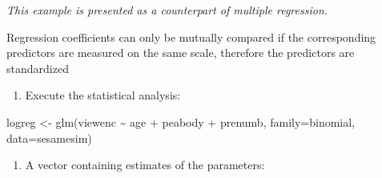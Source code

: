 \documentclass[
]{book}
\newenvironment{Shaded}{\begin{snugshade}}{\end{snugshade}}
\newcommand{\AttributeTok}[1]{\textcolor[rgb]{0.77,0.63,0.00}{#1}}
\newcommand{\FunctionTok}[1]{\textcolor[rgb]{0.00,0.00,0.00}{#1}}
\newcommand{\NormalTok}[1]{#1}
\newcommand{\OtherTok}[1]{\textcolor[rgb]{0.56,0.35,0.01}{#1}}
\newcommand{\SpecialCharTok}[1]{\textcolor[rgb]{0.00,0.00,0.00}{#1}}
\providecommand{\tightlist}{%
  \setlength{\itemsep}{0pt}\setlength{\parskip}{0pt}}
\begin{document}
\emph{This example is presented as a counterpart of multiple regression.}

Regression coefficients can only be mutually compared if the corresponding predictors are measured on the same scale, therefore the predictors are standardized

\begin{Shaded}
\end{Shaded}

\begin{enumerate}
\def\labelenumi{\arabic{enumi})}
\tightlist
\item
  Execute the statistical analysis:
\end{enumerate}

\begin{Shaded}
\begin{Highlighting}[]
\NormalTok{logreg }\OtherTok{\textless{}{-}} \FunctionTok{glm}\NormalTok{(viewenc }\SpecialCharTok{\textasciitilde{}}\NormalTok{ age }\SpecialCharTok{+}\NormalTok{ peabody }\SpecialCharTok{+}\NormalTok{ prenumb, }\AttributeTok{family=}\NormalTok{binomial,}
\AttributeTok{data=}\NormalTok{sesamesim)}
\end{Highlighting}
\end{Shaded}

\begin{enumerate}
\def\labelenumi{\alph{enumi})}
\tightlist
\item
  A vector containing estimates of the parameters:
\end{enumerate}
\end{document}
